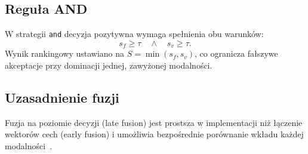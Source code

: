 \subsection{Reguła AND}

W strategii \texttt{and} decyzja pozytywna wymaga spełnienia obu warunków:
\begin{equation}
    s_f \geq \tau \quad \land \quad s_v \geq \tau.
\end{equation}
Wynik rankingowy ustawiano na $S = \min(s_f, s_v)$, co ogranicza fałszywe akceptacje przy dominacji jednej, zawyżonej modalności.

\subsection{Uzasadnienie fuzji}

Fuzja na poziomie decyzji (late fusion) jest prostsza w implementacji niż łączenie wektorów cech (early fusion) i umożliwia bezpośrednie porównanie wkładu każdej modalności~\cite{ross2006multimodal}.
